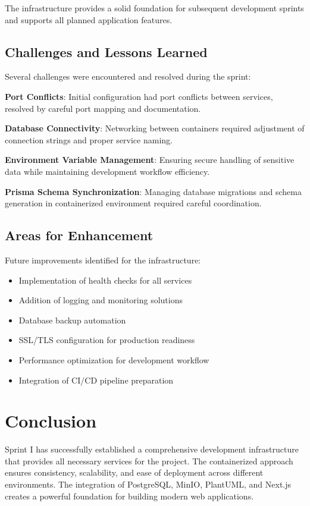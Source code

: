 The infrastructure provides a solid foundation for subsequent development sprints and supports all planned application features.

\subsection{Challenges and Lessons Learned}

Several challenges were encountered and resolved during the sprint:

\textbf{Port Conflicts}: Initial configuration had port conflicts between services, resolved by careful port mapping and documentation.

\textbf{Database Connectivity}: Networking between containers required adjustment of connection strings and proper service naming.

\textbf{Environment Variable Management}: Ensuring secure handling of sensitive data while maintaining development workflow efficiency.

\textbf{Prisma Schema Synchronization}: Managing database migrations and schema generation in containerized environment required careful coordination.

\subsection{Areas for Enhancement}

Future improvements identified for the infrastructure:

\begin{itemize}
    \item Implementation of health checks for all services
    \item Addition of logging and monitoring solutions
    \item Database backup automation
    \item SSL/TLS configuration for production readiness
    \item Performance optimization for development workflow
    \item Integration of CI/CD pipeline preparation
\end{itemize}

\section{Conclusion}

Sprint I has successfully established a comprehensive development infrastructure that provides all necessary services for the project. The containerized approach ensures consistency, scalability, and ease of deployment across different environments. The integration of PostgreSQL, MinIO, PlantUML, and Next.js creates a powerful foundation for building modern web applications.

